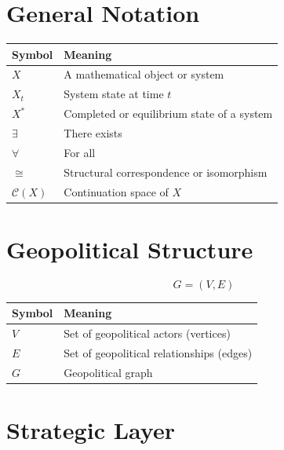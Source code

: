 \documentclass[11pt,openany]{book}
\theoremstyle{plain}
\theoremstyle{definition}
\begin{document}
\section*{General Notation}

\begin{center}
\begin{tabular}{ll}
\toprule
\textbf{Symbol} & \textbf{Meaning} \\
\midrule
\(X\) & A mathematical object or system \\
\(X_t\) & System state at time \(t\) \\
\(X^{*}\) & Completed or equilibrium state of a system \\
\(\exists\) & There exists \\
\(\forall\) & For all \\
\(\cong\) & Structural correspondence or isomorphism \\
\(\mathcal{C}(X)\) & Continuation space of \(X\) \\
\bottomrule
\end{tabular}
\end{center}

\section*{Geopolitical Structure}

\[
G=(V,E)
\]

\begin{center}
\begin{tabular}{ll}
\toprule
\textbf{Symbol} & \textbf{Meaning} \\
\midrule
\(V\) & Set of geopolitical actors (vertices) \\
\(E\) & Set of geopolitical relationships (edges) \\
\(G\) & Geopolitical graph \\
\bottomrule
\end{tabular}
\end{center}

\section*{Strategic Layer}
\end{document}
